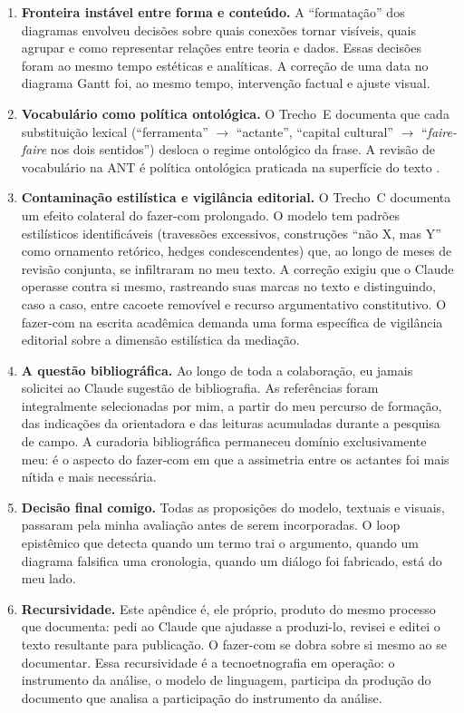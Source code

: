 \begin{enumerate}
\item \textbf{Fronteira instável entre forma e conteúdo.} A ``formatação'' dos diagramas envolveu decisões sobre quais conexões tornar visíveis, quais agrupar e como representar relações entre teoria e dados. Essas decisões foram ao mesmo tempo estéticas e analíticas. A correção de uma data no diagrama Gantt foi, ao mesmo tempo, intervenção factual e ajuste visual.

\item \textbf{Vocabulário como política ontológica.} O Trecho~E documenta que cada substituição lexical (``ferramenta'' $\rightarrow$ ``actante'', ``capital cultural'' $\rightarrow$ ``\textit{faire-faire} nos dois sentidos'') desloca o regime ontológico da frase. A revisão de vocabulário na ANT é política ontológica praticada na superfície do texto \parencite{mol1999ontological}.

\item \textbf{Contaminação estilística e vigilância editorial.} O Trecho~C documenta um efeito colateral do fazer-com prolongado. O modelo tem padrões estilísticos identificáveis (travessões excessivos, construções ``não X, mas Y'' como ornamento retórico, hedges condescendentes) que, ao longo de meses de revisão conjunta, se infiltraram no meu texto. A correção exigiu que o Claude operasse contra si mesmo, rastreando suas marcas no texto e distinguindo, caso a caso, entre cacoete removível e recurso argumentativo constitutivo. O fazer-com na escrita acadêmica demanda uma forma específica de vigilância editorial sobre a dimensão estilística da mediação.

\item \textbf{A questão bibliográfica.} Ao longo de toda a colaboração, eu jamais solicitei ao Claude sugestão de bibliografia. As referências foram integralmente selecionadas por mim, a partir do meu percurso de formação, das indicações da orientadora e das leituras acumuladas durante a pesquisa de campo. A curadoria bibliográfica permaneceu domínio exclusivamente meu: é o aspecto do fazer-com em que a assimetria entre os actantes foi mais nítida e mais necessária.

\item \textbf{Decisão final comigo.} Todas as proposições do modelo, textuais e visuais, passaram pela minha avaliação antes de serem incorporadas. O loop epistêmico que detecta quando um termo trai o argumento, quando um diagrama falsifica uma cronologia, quando um diálogo foi fabricado, está do meu lado.

\item \textbf{Recursividade.} Este apêndice é, ele próprio, produto do mesmo processo que documenta: pedi ao Claude que ajudasse a produzi-lo, revisei e editei o texto resultante para publicação. O fazer-com se dobra sobre si mesmo ao se documentar. Essa recursividade é a tecnoetnografia em operação: o instrumento da análise, o modelo de linguagem, participa da produção do documento que analisa a participação do instrumento da análise.

\end{enumerate}